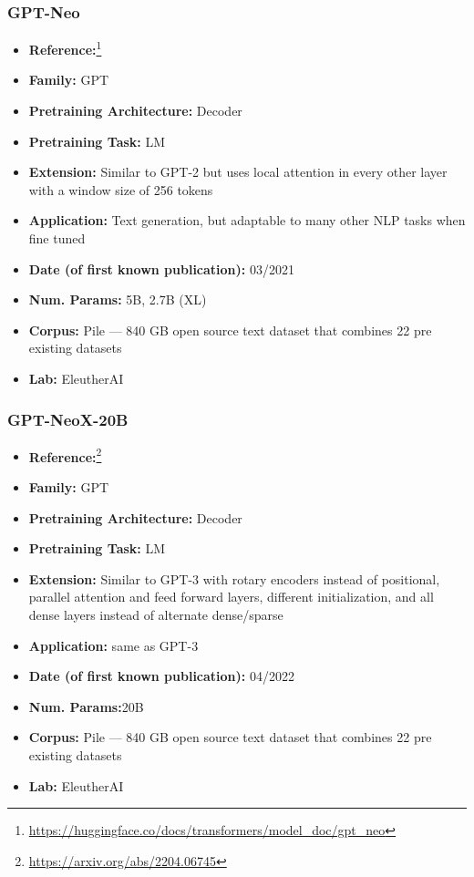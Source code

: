 \documentclass{article}
\begin{document}
\subsubsection{GPT-Neo}

            \begin{itemize}
                \item \textbf{Reference:}\footnote{\url{https://huggingface.co/docs/transformers/model_doc/gpt_neo}}
                \item \textbf{Family:} GPT 
                \item \textbf{Pretraining Architecture:} Decoder
                \item \textbf{Pretraining Task:} LM
                \item \textbf{Extension:} Similar to GPT-2 but uses local attention in every other layer with a window size of 256 tokens  
                \item \textbf{Application:} Text generation, but adaptable to many other NLP tasks when fine tuned
                \item \textbf{Date (of first known publication):} 03/2021
                \item \textbf{Num. Params:} 5B, 2.7B (XL)
                \item \textbf{Corpus:} Pile — 840 GB open source text dataset that combines 22 pre existing datasets
                \item \textbf{Lab:} EleutherAI
            \end{itemize}
 
\subsubsection{GPT-NeoX-20B}

            \begin{itemize}
                \item \textbf{Reference:}\footnote{\url{https://arxiv.org/abs/2204.06745}}\cite{black2022gpt}
                \item \textbf{Family:} GPT 
                \item \textbf{Pretraining Architecture:} Decoder
                \item \textbf{Pretraining Task:} LM
                \item \textbf{Extension:} Similar to GPT-3 with rotary encoders instead of positional, parallel attention and feed forward layers, different initialization, and all dense layers instead of alternate dense/sparse  
                \item \textbf{Application:} same as GPT-3
                \item \textbf{Date (of first known publication):} 04/2022
                \item \textbf{Num. Params:}20B
                \item \textbf{Corpus:} Pile — 840 GB open source text dataset that combines 22 pre existing datasets
                \item \textbf{Lab:} EleutherAI
            \end{itemize}
\end{document}
